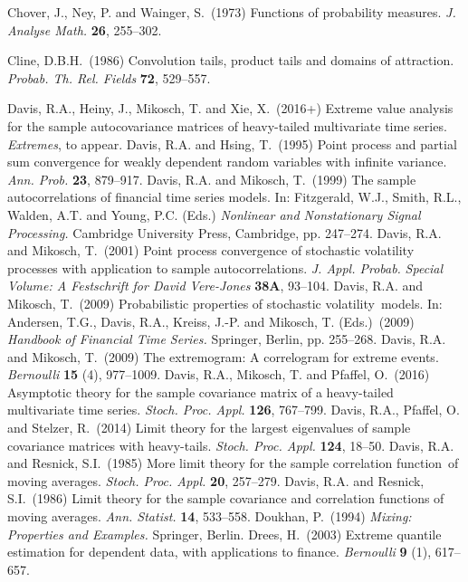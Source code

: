 \documentclass[leqno,10pt]{amsart}
\newcommand{\1}{{\bf 1}}
\newcommand{\8}{\infty}
\newcommand{\sv}{stochastic volatility}
\newcommand{\fct}{function}
\begin{document}
\begin{thebibliography}{99}
{\sc Chover, J., Ney, P. and Wainger, S.}\ (1973)
Functions of probability measures. {\em J. Analyse Math.} {\bf 26}, 255--302.

{\sc Cline, D.B.H.}\ (1986)
Convolution tails, product tails and domains of attraction. {\em Probab. Th. Rel. Fields} {\bf 72}, 529--557.

{\sc Davis, R.A., Heiny, J., Mikosch, T. and Xie, X.}\ (2016+)
Extreme value analysis for the sample autocovariance matrices of heavy-tailed multivariate time series. {\em Extremes}, to appear. 
{\sc Davis, R.A. and Hsing, T.}\ (1995) 
Point process and partial sum convergence for weakly dependent random variables with infinite variance. {\em Ann. Prob.} {\bf 23}, 879--917.
{\sc Davis, R.A. and Mikosch, T.}\ (1999)
The sample autocorrelations of financial time series models.
In: {\sc Fitzgerald, W.J., Smith, R.L., Walden, A.T.  and Young, P.C. (Eds.)}
{\em Nonlinear and Nonstationary Signal Processing.}
Cambridge University Press, Cambridge, pp. 247--274.
{\sc Davis, R.A. and Mikosch, T.}\ (2001)
Point process convergence of stochastic volatility processes
with application to sample autocorrelations. 
{\em J. Appl. Probab.} {\em Special Volume: A Festschrift for 
David Vere-Jones} {\bf 38A}, 93--104.
{\sc Davis, R.A. and Mikosch, T.}\ (2009)
Probabilistic properties of \sv\ models. In: {\sc Andersen, T.G., Davis, R.A., Kreiss, J.-P. and Mikosch, T. (Eds.)}\ (2009)
{\em Handbook of Financial Time Series.} Springer, Berlin, pp. 255--268.
{\sc Davis, R.A. and Mikosch, T.}\ (2009)
The extremogram: A correlogram for extreme events. 
{\em Bernoulli} {\bf 15} (4), 977--1009.
{\sc Davis, R.A., Mikosch, T. and Pfaffel, O.}\ (2016)
Asymptotic theory for the sample covariance matrix of a heavy-tailed multivariate time series. {\em Stoch. Proc. Appl.} {\bf 126}, 767--799.
{\sc Davis, R.A., Pfaffel, O. and Stelzer, R.}\ (2014)
Limit theory for the largest eigenvalues of sample covariance matrices with heavy-tails. {\em Stoch. Proc. Appl.} {\bf 124}, 18--50.
{\sc Davis, R.A. and Resnick, S.I.}\ (1985)
More limit theory for the sample correlation \fct\ of moving averages.
{\em Stoch. Proc. Appl.} {\bf 20}, 257--279.
{\sc Davis, R.A. and Resnick, S.I.}\ (1986)
Limit theory for the sample covariance and correlation \fct s of moving averages. {\em Ann. Statist.} {\bf 14}, 533--558.
{\sc Doukhan, P.}\ (1994)
{\em Mixing: Properties and Examples.} Springer, Berlin.
{\sc Drees, H.}\ (2003)
Extreme quantile estimation for dependent data, with applications to finance. {\em Bernoulli} {\bf 9} (1), 617--657.


\end{thebibliography}
\end{document}

